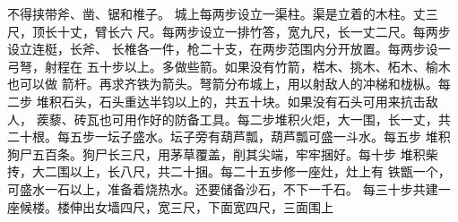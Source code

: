 \documentclass[12pt,UTF8]{ctexbook}
\begin{document}
不得挟带斧、凿、锯和椎子。 
城上每两步设立一渠柱。渠是立着的木柱。丈三尺，顶长十丈，臂长六 
尺。每两步设立一排竹答，宽九尺，长一丈二尺。每两步设立连梃，长斧、 
长椎各一件，枪二十支，在两步范围内分开放置。每两步设一弓弩，射程在 
五十步以上。多做些箭。如果没有竹箭，楛木、挑木、柘木、榆木也可以做 
箭杆。再求齐铁为箭头。弩箭分布城上，用以射敌人的冲梯和栊枞。每二步 
堆积石头，石头重达半钧以上的，共五十块。如果没有石头可用来抗击敌人， 
蒺藜、砖瓦也可用作好的防备工具。每二步堆积火炬，大一围，长一丈，共 
二十根。每五步一坛子盛水。坛子旁有葫芦瓢，葫芦瓢可盛一斗水。每五步 
堆积狗尸五百条。狗尸长三尺，用茅草覆盖，削其尖端，牢牢捆好。每十步 
堆积柴抟，大二围以上，长八尺，共二十捆。每二十五步修一座灶，灶上有 
铁甑一个，可盛水一石以上，准备着烧热水。还要储备沙石，不下一千石。 
每三十步共建一座候楼。楼伸出女墙四尺，宽三尺，下面宽四尺，三面围上 
\end{document}
